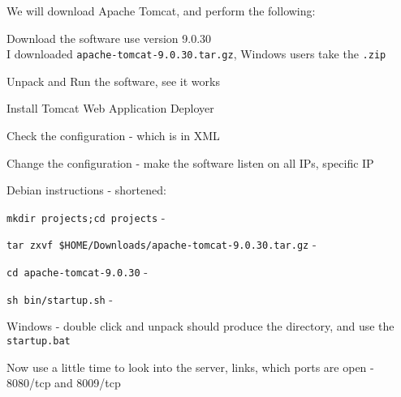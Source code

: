 \documentclass[Screen16to9,17pt]{foils}
\begin{document}

We will download Apache Tomcat, and perform the following:
\begin{list2}
\item Download the software use version 9.0.30\\
I downloaded \verb+apache-tomcat-9.0.30.tar.gz+, Windows users take the \verb+.zip+
\item Unpack and Run the software, see it works
\item Install Tomcat Web Application Deployer
\item Check the configuration - which is in XML
\item Change the configuration - make the software listen on all IPs, specific IP
\end{list2}







Debian instructions - shortened:
\begin{list2}
\item \verb+mkdir projects;cd projects+ -
\item \verb+tar zxvf $HOME/Downloads/apache-tomcat-9.0.30.tar.gz+ -
\item \verb+cd apache-tomcat-9.0.30+ -
\item \verb+sh bin/startup.sh+ -
\end{list2}

Windows - double click and unpack should produce the directory, and use the \verb+startup.bat+



Now use a little time to look into the server, links, which ports are open - 8080/tcp and 8009/tcp


\begin{list2}
\item
\item
\item
\end{list2}




\slidenext
\end{document}
